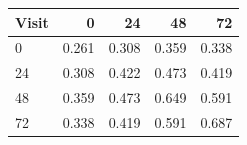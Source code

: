 \small
\begin{tabular}{lrrrr}
\hline
Visit & 0 & 24 & 48 & 72 \\
\hline
0 & 0.261 & 0.308 & 0.359 & 0.338 \\
24 & 0.308 & 0.422 & 0.473 & 0.419 \\
48 & 0.359 & 0.473 & 0.649 & 0.591 \\
72 & 0.338 & 0.419 & 0.591 & 0.687 \\
\hline
\end{tabular}

